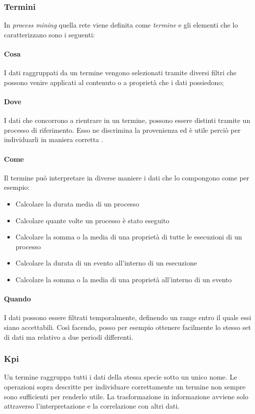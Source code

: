 \subsubsection{Termini}
In \textit{process mining} quella rete viene definita come \emph{termine} e gli elementi che lo caratterizzano sono i seguenti:
\paragraph{Cosa}
I dati raggruppati da un termine vengono selezionati tramite diversi filtri che possono venire applicati al contenuto o a proprietà che i dati possiedono;

\paragraph{Dove}
I dati che concorrono a rientrare in un termine, possono essere distinti tramite un processo di riferimento. Esso ne discrimina la provenienza ed è utile perciò per individuarli in maniera corretta .

\paragraph{Come}
Il termine può interpretare in diverse maniere i dati che lo compongono come per esempio:
\begin{itemize}
    \item Calcolare la durata media di un processo
    \item Calcolare quante volte un processo è stato eseguito
    \item Calcolare la somma o la media di una proprietà di tutte le esecuzioni di un processo
    \item Calcolare la durata di un evento all'interno di un esecuzione
    \item Calcolare la somma o la media di una proprietà all'interno di un evento
\end{itemize}

\paragraph{Quando}
I dati possono essere filtrati temporalmente, definendo un range entro il quale essi siano accettabili. Così facendo, posso per esempio ottenere facilmente lo stesso set di dati ma relativo a due periodi differenti.
\subsubsection{Kpi}
Un termine raggruppa tutti i dati della stessa specie sotto un unico nome.
Le operazioni sopra descritte per individuare correttamente un termine non sempre sono sufficienti per renderlo utile. La trasformazione in informazione avviene solo attraverso l'interpretazione e la correlazione con altri dati.

